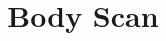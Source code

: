
\graphicspath{{images/}} %


\title{Body Scan} %



\begin{frame}
\titlepage %
\end{frame}









 